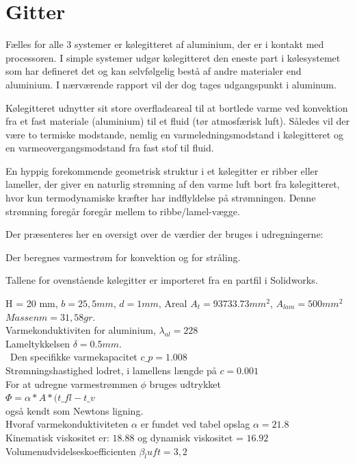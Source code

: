 \section{Gitter}

Fælles for alle 3 systemer er kølegitteret af aluminium, der er i kontakt med processoren. 
I simple systemer udgør kølegitteret den eneste part i kølesystemet som har defineret det og kan selvfølgelig bestå af andre materialer end aluminium. I nærværende rapport vil der dog tages udgangspunkt i aluminum.

Kølegitteret udnytter sit store overfladeareal til at bortlede varme ved konvektion fra et fast materiale (aluminium) til et fluid (tør atmosfærisk luft).
Således vil der være to termiske modstande, nemlig en varmeledningsmodstand i kølegitteret og en varmeovergangsmodstand fra fast stof til fluid.

En hyppig forekommende geometrisk struktur i et kølegitter er ribber eller lameller, der giver en naturlig strømning af den varme luft bort fra kølegitteret, hvor kun termodynamiske kræfter har indflyldelse på strømningen. Denne strømning foregår foregår mellem to ribbe/lamel-vægge. 

Der præsenteres her en oversigt over de værdier der bruges i udregningerne: 

Der beregnes varmestrøm for konvektion og for stråling.

Tallene for ovenstående kølegitter er importeret fra en partfil i Solidworks. %

H = 20 mm, $b = 25,5 mm$, $d = 1 mm$, Areal $A_t = 93733.73 mm^2$, $A_{lam}= 500 mm^2$  \\ 
$ Massen m = 31,58 gr.$ \\
Varmekonduktiviten for aluminium, $\lambda_{al} = 228$ \\  
Lameltykkelsen $\delta = 0.5 mm.$  \\\
Den specifikke varmekapacitet $c\_p = 1.008$ \\
Strømningshastighed lodret, i lamellens længde på $c = 0.001$ \\

For at udregne varmestrømmen $\phi$  bruges udtrykket \\ $\Phi = \alpha * A* (t\_{fl}-t\_v$ \\  også kendt som Newtons ligning. \\ 
Hvoraf varmekonduktiviteten $\alpha$ er fundet ved tabel opslag $\alpha = 21.8$ \\
Kinematisk viskositet er: $18.88$ og dynamisk viskositet = $16.92$  \\
Volumenudvidelseskoefficienten $\beta_luft = 3,2$ \\
 
